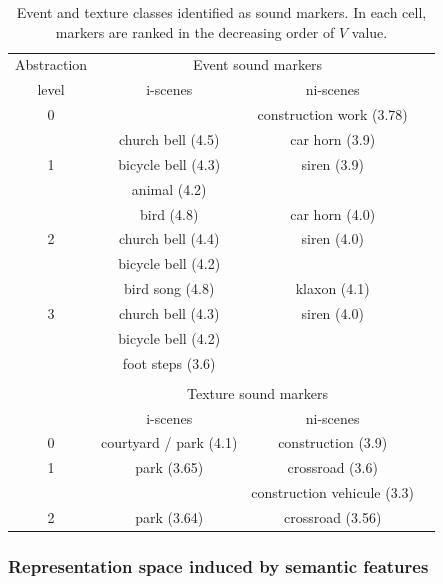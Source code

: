 \documentclass[twoside,twocolumn]{article}
\begin{document}
\begin{table}[t]
 \setlength{\tabcolsep}{0.2pt}
 \centering
  {\renewcommand{\arraystretch}{0.9}
\begin{tabular}{c c c c}
Abstraction        & \multicolumn{2}{c}{Event sound markers} \\
level & i-scenes & ni-scenes \\
\hline
0  &                          & construction work (3.78)  \\
\hline
  & church bell  (4.5)             & car horn  (3.9) \\
1 & bicycle bell  (4.3)      & siren (3.9)\\
  & animal (4.2)              &       \\
   \hline
  & bird        (4.8)       & car horn  (4.0)\\
2 & church bell  (4.4)             & siren (4.0)\\
  & bicycle bell     (4.2)             &       \\
   \hline
  & bird song (4.8)        & klaxon  (4.1)\\
3 & church bell   (4.3)            & siren (4.0)\\
  & bicycle bell      (4.2)   &       \\
  & foot steps  (3.6)      &  \\
  &                           & \\
  & \multicolumn{2}{c}{Texture sound markers}      \\
  & i-scenes & ni-scenes \\
\hline
0 &     courtyard / park (4.1) &  construction (3.9)  \\
\hline
1 &     park (3.65)          &  crossroad (3.6)  \\
  &                          &  construction vehicule (3.3)  \\
\hline
2 &     park (3.64)          &  crossroad (3.56)  \\
\hline
\end{tabular}
}
\vspace{0.5mm}
\caption{Event and texture classes identified as sound markers. In each cell, markers are ranked in the decreasing order of $V$ value.}
\label{tab:markers}
\end{table}

\subsubsection*{Representation space induced by semantic features}
\end{document}
